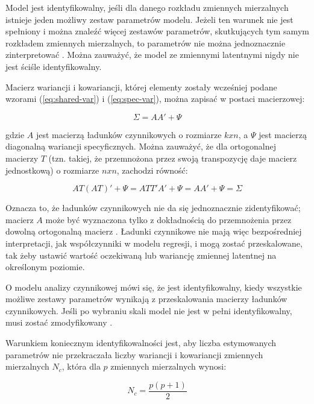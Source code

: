 \documentclass[12pt]{article}
\begin{document}
Model jest identyfikowalny, jeśli dla danego rozkładu zmiennych mierzalnych istnieje jeden możliwy zestaw parametrów modelu. Jeżeli ten warunek nie jest spełniony i można znaleźć więcej zestawów parametrów, skutkujących tym samym rozkładem zmiennych mierzalnych, to parametrów nie można jednoznacznie zinterpretować \citep{ESSEduNet}. Można zauważyć, że model ze zmiennymi latentnymi nigdy nie jest ściśle identyfikowalny.

Macierz wariancji i kowariancji, której elementy zostały wcześniej podane wzorami (\ref{eq:shared-var}) i (\ref{eq:spec-var}), można zapisać w postaci macierzowej:

\begin{equation}
\label{eq:var-matrix}
\Sigma = A A' + \Psi
\end{equation}

gdzie \(A\) jest macierzą ładunków czynnikowych o rozmiarze \(k x n\), a \(\Psi\) jest macierzą diagonalną wariancji specyficznych. Można zauważyć, że dla ortogonalnej macierzy \(T\) (tzn. takiej, że przemnożona przez swoją transpozycję daje macierz jednostkową) o rozmiarze \(n x n\), zachodzi równość:

\begin{equation}
\label{eq:scaling}
A T (A T)' + \Psi = A T T' A' + \Psi = A A' + \Psi = \Sigma
\end{equation}

Oznacza to, że ładunków czynnikowych nie da się jednoznacznie zidentyfikować; macierz \(A\) może być wyznaczona tylko z dokładnością do przemnożenia przez dowolną ortogonalną macierz \citep{Shapiro}. Ładunki czynnikowe nie mają więc bezpośredniej interpretacji, jak współczynniki w modelu regresji, i mogą zostać przeskalowane, tak żeby ustawić wartość oczekiwaną lub wariancję zmiennej latentnej na określonym poziomie.

O modelu analizy czynnikowej mówi się, że jest identyfikowalny, kiedy wszystkie możliwe zestawy parametrów wynikają z przeskalowania macierzy ładunków czynnikowych. Jeśli po wybraniu skali model nie jest w pełni identyfikowalny, musi zostać zmodyfikowany \citep{ESSEduNet}.

Warunkiem koniecznym identyfikowalności jest, aby liczba estymowanych parametrów nie przekraczała liczby wariancji i kowariancji zmiennych mierzalnych \(N_c\), która dla \(p\) zmiennych mierzalnych wynosi:

\begin{equation}
\label{eq:ident-condition}
N_c = \frac{p(p+1)}{2}
\end{equation}
\end{document}

